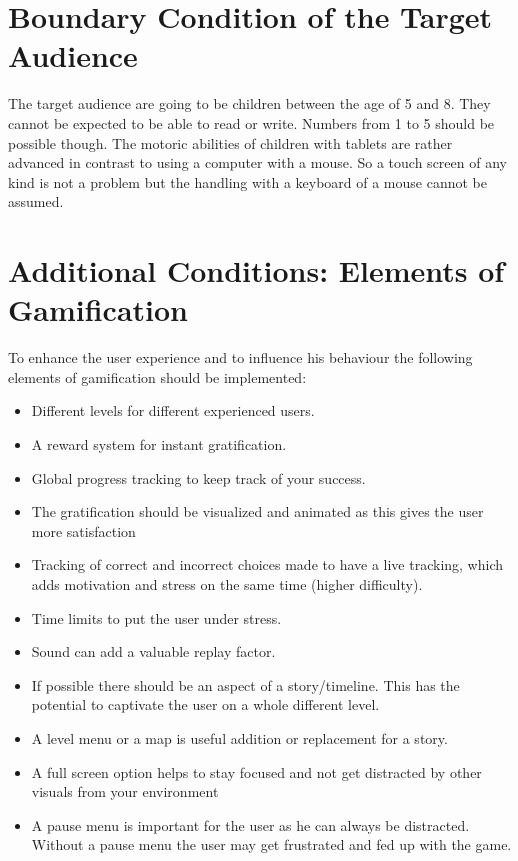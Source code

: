 \section{Boundary Condition of the Target Audience}\label{sec:boundary-condition-of-the-target-audience}
The target audience are going to be children between the age of 5 and 8.
They cannot be expected to be able to read or write. Numbers from 1 to 5 should be possible though.
The motoric abilities of children with tablets are rather advanced in contrast to using a computer with a mouse.
So a touch screen of any kind is not a problem but the handling with a keyboard of a mouse cannot be assumed.

\section{Additional Conditions: Elements of Gamification}\label{sec:additional-conditions:-elements-of-gamification}
To enhance the user experience and to influence his behaviour the following elements of gamification should be implemented:
\begin{itemize}
    \item Different levels for different experienced users.
    \item A reward system for instant gratification.
    \item Global progress tracking to keep track of your success.
    \item The gratification should be visualized and animated as this gives the user more satisfaction
    \item Tracking of correct and incorrect choices made to have a live tracking, which adds motivation and
    stress on the same time (higher difficulty).
    \item Time limits to put the user under stress.
    \item Sound can add a valuable replay factor.
    \item If possible there should be an aspect of a story/timeline. This has the potential to captivate the user on a
    whole different level.
    \item A level menu or a map is useful addition or replacement for a story.
    \item A full screen option helps to stay focused and not get distracted by other visuals from your environment
    \item A pause menu is important for the user as he can always be distracted.
    Without a pause menu the user may get frustrated and fed up with the game.
\end{itemize}

